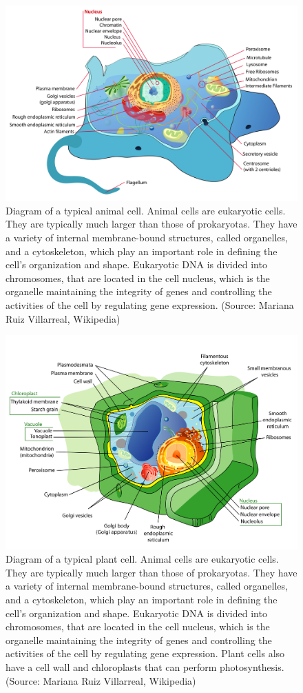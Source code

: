 \documentclass[
  11pt,
]{book}
\begin{document}
\begin{figure}

{\centering \includegraphics[width=0.5\linewidth]{./figs/animalCell} 

}

\caption{Diagram of a typical animal cell. Animal cells are eukaryotic cells. They are typically much larger than those of prokaryotas. They have a variety of internal membrane-bound structures, called organelles, and a cytoskeleton, which play an important role in defining the cell's organization and shape. Eukaryotic DNA is divided into chromosomes, that are located in the cell nucleus, which is the organelle maintaining the integrity of genes and controlling the activities of the cell by regulating gene expression. (Source: Mariana Ruiz Villarreal, Wikipedia)}\label{fig:animalCell}
\end{figure}

\begin{figure}

{\centering \includegraphics[width=0.5\linewidth]{./figs/plantCell} 

}

\caption{Diagram of a typical plant cell. Animal cells are eukaryotic cells. They are typically much larger than those of prokaryotas. They have a variety of internal membrane-bound structures, called organelles, and a cytoskeleton, which play an important role in defining the cell's organization and shape. Eukaryotic DNA is divided into chromosomes, that are located in the cell nucleus, which is the organelle maintaining the integrity of genes and controlling the activities of the cell by regulating gene expression. Plant cells also have a cell wall and chloroplasts that can perform photosynthesis. (Source: Mariana Ruiz Villarreal, Wikipedia)}\label{fig:plantCell}
\end{figure}
\end{document}
